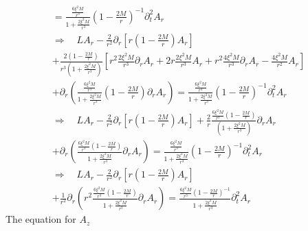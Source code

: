 \documentclass[12pt]{article}
\def\nn{\nonumber}
\begin{document}
\begin{gather}
=
\frac{\frac{6 \xi^{2} M}{r^{3}} }{1 + \frac{2 \xi^{2} M}{r^{3}}}
(1 - \frac{2 M}{r})^{-1}
\partial_{t}^{2} A_{r} 
\nn \\
\Rightarrow
\quad
L A_{r}
-
\frac{2}{r^{2}}
\partial_{r}
\left[
r
(1 - \frac{2 M}{r})
A_{r}
\right]
\nn \\
+
\frac{2 (1 - \frac{2 M}{r})}{r^{3} (1 + \frac{2 \xi^{2} M}{r^{3}})}
\left[
r^{2}
\frac{2 \xi^{2} M}{r^{3}}
\partial_{r}
A_{r}
+
2
r
\frac{2 \xi^{2} M}{r^{3}}
A_{r}
+
r^{2}
\frac{4 \xi^{2} M}{r^{3}}
\partial_{r}
A_{r}
-
\frac{4 \xi^{2} M}{r^{2}}
A_{r}
\right]
\nn \\
+
\partial_{r}
\left(
\frac{\frac{6 \xi^{2} M}{r^{3}} }{1 + \frac{2 \xi^{2} M}{r^{3}}}
(1 - \frac{2 M}{r})
\partial_{r} A_{r}
\right)
=
\frac{\frac{6 \xi^{2} M}{r^{3}} }{1 + \frac{2 \xi^{2} M}{r^{3}}}
(1 - \frac{2 M}{r})^{-1}
\partial_{t}^{2} A_{r} 
\nn \\
\Rightarrow
\quad
L A_{r}
-
\frac{2}{r^{2}}
\partial_{r}
\left[
r
(1 - \frac{2 M}{r})
A_{r}
\right]
+
\frac{2}{r}
\frac{\frac{6 \xi^{2} M}{r^{3}} (1 - \frac{2 M}{r})}{ (1 + \frac{2 \xi^{2} M}{r^{3}})}
\partial_{r}
A_{r}
\nn \\
+
\partial_{r}
\left(
\frac{\frac{6 \xi^{2} M}{r^{3}} (1 - \frac{2 M}{r})}{1 + \frac{2 \xi^{2} M}{r^{3}}}
\partial_{r} A_{r}
\right)
=
\frac{\frac{6 \xi^{2} M}{r^{3}} }{1 + \frac{2 \xi^{2} M}{r^{3}}}
(1 - \frac{2 M}{r})^{-1}
\partial_{t}^{2} A_{r} 
\nn \\
\Rightarrow
\quad
L A_{r}
-
\frac{2}{r^{2}}
\partial_{r}
\left[
r
(1 - \frac{2 M}{r})
A_{r}
\right]
\nn \\
+
\frac{1}{r^{2}}
\partial_{r}
\left(
r^{2}
\frac{\frac{6 \xi^{2} M}{r^{3}} (1 - \frac{2 M}{r})}{1 + \frac{2 \xi^{2} M}{r^{3}}}
\partial_{r} A_{r}
\right)
=
\frac{\frac{6 \xi^{2} M}{r^{3}} (1 - \frac{2 M}{r})^{-1}}{1 + \frac{2 \xi^{2} M}{r^{3}}}
\partial_{t}^{2} A_{r} 
\end{gather}
The equation for $A_{z}$
\end{document}
